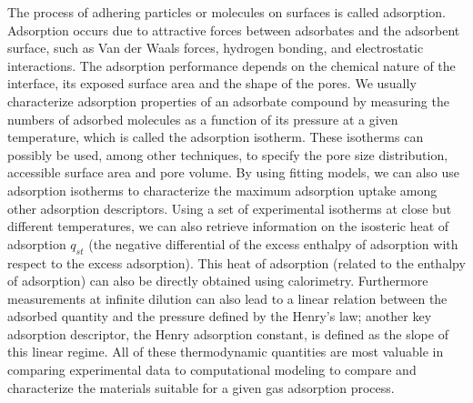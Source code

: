 \documentclass[main.tex]{subfiles}
\begin{document}
The process of adhering particles or molecules on surfaces is called adsorption. Adsorption occurs due to attractive forces between adsorbates and the adsorbent surface, such as Van der Waals forces, hydrogen bonding, and electrostatic interactions. The adsorption performance depends on the chemical nature of the interface, its exposed surface area and the shape of the pores. We usually characterize adsorption properties of an adsorbate compound by measuring the numbers of adsorbed molecules as a function of its pressure at a given temperature, which is called the adsorption isotherm. These isotherms can possibly be used, among other techniques, to specify the pore size distribution, accessible surface area and pore volume.\cite{Rouquerol_1994} By using fitting models, we can also use adsorption isotherms to characterize the maximum adsorption uptake among other adsorption descriptors.\cite{Wang_2020} Using a set of experimental isotherms at close but different temperatures, we can also retrieve information on the isosteric heat of adsorption $q_{st}$ (the negative differential of the excess enthalpy of adsorption with respect to the excess adsorption).\cite{Nicholson2000} This heat of adsorption (related to the enthalpy of adsorption) can also be directly obtained using calorimetry.\cite{Dunne_1996} Furthermore measurements at infinite dilution can also lead to a linear relation between the adsorbed quantity and the pressure defined by the Henry's law; another key adsorption descriptor, the Henry adsorption constant, is defined as the slope of this linear regime.\cite{Finsy2007} All of these thermodynamic quantities are most valuable in comparing experimental data to computational modeling to compare and characterize the materials suitable for a given gas adsorption process.
\end{document}

